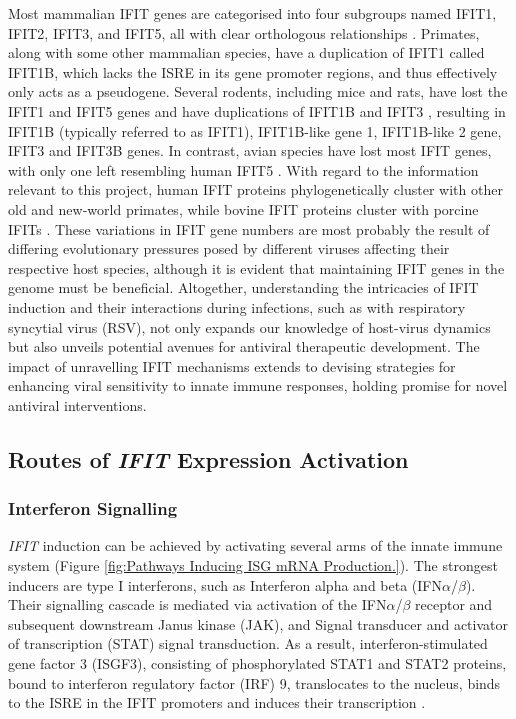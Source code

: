 Most mammalian IFIT genes are categorised into four subgroups named IFIT1, IFIT2, IFIT3, and IFIT5, all with clear orthologous relationships \cite{Sarkar2004NovelGenes}. Primates, along with some other mammalian species, have a duplication of IFIT1 called IFIT1B, which lacks the ISRE in its gene promoter regions, and thus effectively only acts as a pseudogene. Several rodents, including mice and rats, have lost the IFIT1 and IFIT5 genes and have duplications of IFIT1B and IFIT3 \cite{Daugherty2016Evolution-guidedMammals.}, resulting in IFIT1B (typically referred to as IFIT1), IFIT1B-like gene 1, IFIT1B-like 2 gene, IFIT3 and IFIT3B genes. In contrast, avian species have lost most IFIT genes, with only one left resembling human IFIT5 \cite{Liu2013Lineage-SpecificFamily}. With regard to the information relevant to this project, human IFIT proteins phylogenetically cluster with other old and new-world primates, while bovine IFIT proteins cluster with porcine IFITs \cite{Zhou2013InterferonDefense.}. These variations in IFIT gene numbers are most probably the result of differing evolutionary pressures posed by different viruses affecting their respective host species, although it is evident that maintaining IFIT genes in the genome must be beneficial. Altogether, understanding the intricacies of IFIT induction and their interactions during infections, such as with respiratory syncytial virus (RSV), not only expands our knowledge of host-virus dynamics but also unveils potential avenues for antiviral therapeutic development. The impact of unravelling IFIT mechanisms extends to devising strategies for enhancing viral sensitivity to innate immune responses, holding promise for novel antiviral interventions.

\subsection{Routes of \textit{IFIT} Expression Activation} \label{subsec:Routes of IFIT Expression Activation}
\subsubsection{Interferon Signalling} \label{Interferon Signalling}
\textit{IFIT} induction can be achieved by activating several arms of the innate immune system (Figure \ref{fig:Pathways Inducing ISG mRNA Production.}). The strongest inducers are type I interferons, such as Interferon alpha and beta (IFN\(\alpha\)/\(\beta\)). Their signalling cascade is mediated via activation of the IFN\(\alpha\)/\(\beta\) receptor and subsequent downstream Janus kinase (JAK), and Signal transducer and activator of transcription (STAT) signal transduction. As a result, interferon-stimulated gene factor 3 (ISGF3), consisting of phosphorylated STAT1 and STAT2 proteins, bound to interferon regulatory factor (IRF) 9, translocates to the nucleus, binds to the ISRE in the IFIT promoters and induces their transcription \cite{Der1998IdentificationArrays, Mesev2019DecodingInfection, Schoggins2011Interferon-stimulatedFunctions}.

